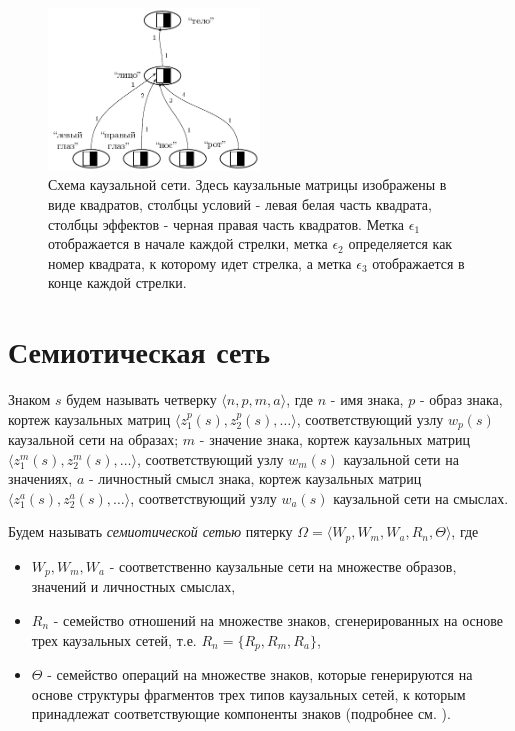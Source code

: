 \documentclass[12pt]{scrartcl}
\begin{document}
	\begin{figure}
		\centering
		\includegraphics[width=0.5\textwidth]{examples/causnet/caus_net}
		\caption{Схема каузальной сети. Здесь каузальные матрицы изображены в виде квадратов, столбцы условий - левая белая часть квадрата, столбцы эффектов - черная правая часть квадратов. Метка $\epsilon_1$ отображается в начале каждой стрелки, метка $\epsilon_2$ определяется как номер квадрата, к которому идет стрелка, а метка $\epsilon_3$ отображается в конце каждой стрелки.}
		\label{fig:caus_net}		
	\end{figure}
	
	\section{Семиотическая сеть} \label{sec:semiotics}
	
	Знаком $s$ будем называть четверку $\langle n, p, m, a\rangle$, где $n$ - имя знака, $p$ - образ знака, кортеж каузальных матриц $\langle z_1^p(s), z_2^p(s), \dots\rangle$, соответствующий узлу $w_p(s)$ каузальной сети на образах;  $m$ - значение знака, кортеж каузальных матриц $\langle z_1^m(s), z_2^m(s), \dots\rangle$, соответствующий узлу $w_m(s)$ каузальной сети на значениях,  $a$ - личностный смысл знака, кортеж каузальных матриц $\langle z_1^a(s), z_2^a(s), \dots\rangle$, соответствующий узлу $w_a(s)$ каузальной сети на смыслах.
			
	Будем называть \textit{семиотической сетью} пятерку $\Omega=\langle W_p, W_m, W_a, R_n, \Theta \rangle$, где
	\begin{itemize}
		\item $W_p, W_m, W_a$ - соответственно каузальные сети на множестве образов, значений и личностных смыслах,
		\item $R_n$ - семейство отношений на множестве знаков, сгенерированных на основе трех каузальных сетей, т.е. $R_n=\{R_p, R_m, R_a\}$,
		\item $\Theta$ - семейство операций на множестве знаков, которые  генерируются на основе структуры фрагментов трех типов каузальных сетей, к которым принадлежат соответствующие компоненты знаков (подробнее см. \cite{Osipov2014c}).
	\end{itemize} 
	
\end{document}
